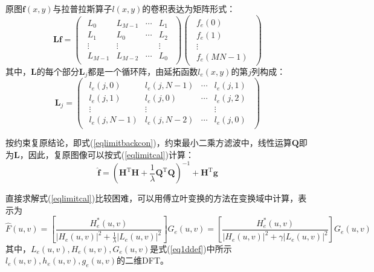 \documentclass[UTF8]{ctexart}
\begin{document}
    原图$\pmb{f}(x,y)$与拉普拉斯算子$l(x,y)$的卷积表达为矩阵形式：
    \begin{equation}
        \pmb{Lf}=\left(\begin{array}{cccc}
            \begin{matrix}
                L_0 & L_{M-1} & \cdots & L_1\\L_1 & L_0 & \cdots & L_2\\\vdots & \vdots & & \vdots\\L_{M-1} & L_{M-2} & \cdots & L_0
            \end{matrix}
        \end{array}\right)\left(\begin{array}{c}
            \begin{matrix}
                f_e(0)\\f_e(1)\\\vdots\\f_e(MN-1)
            \end{matrix}
        \end{array}\right)
    \end{equation}
    其中，$\pmb{L}$的每个部分$\pmb{L}_j$都是一个循环阵，由延拓函数$l_e(x,y)$的第$j$列构成：
    \begin{equation}
        \pmb{L}_j=\left(\begin{array}{cccc}
            \begin{matrix}
                l_e(j,0) & l_e(j,N-1) & \cdots & l_e(j,1)\\l_e(j,1) & l_e(j,0) & \cdots & l_e(j,2)\\\vdots & \vdots & & \vdots\\l_e(j,N-1) & l_e(j,N-2) & \cdots & l_e(j,0)
            \end{matrix}
        \end{array}\right)
    \end{equation}

    按约束复原结论，即式(\ref{eqlimitbackcon})，约束最小二乘方滤波中，线性运算$\pmb{Q}$即为$\pmb{L}$，因此，复原图像可以按式(\ref{eqlimitcal})计算：
    \begin{equation}\label{eqlimitcal}
        \hat{\pmb{f}}=\left(\pmb{H}^{\mathrm{T}}\pmb{H}+\frac{1}{\lambda}\pmb{Q}^{\mathrm{T}}\pmb{Q}\right)^{-1}+\pmb{H}^{\mathrm{T}}\pmb{g}
    \end{equation}

    直接求解式(\ref{eqlimitcal})比较困难，可以用傅立叶变换的方法在变换域中计算，表示为
    \begin{equation}\label{eqfourier}
        \hat{F}(u,v)=\left[\frac{H_e^*(u,v)}{|H_e(u,v)|^2+\frac{1}{\lambda}|L_e(u,v)|^2}\right]G_e(u,v)=\left[\frac{H_e^*(u,v)}{|H_e(u,v)|^2+\gamma|L_e(u,v)|^2}\right]G_e(u,v)
    \end{equation}
    其中，$L_e(u,v),H_e(u,v),G_e(u,v)$是式(\ref{eq1ddef})中所示$l_e(u,v),h_e(u,v),g_e(u,v)$的二维DFT。
\end{document}
